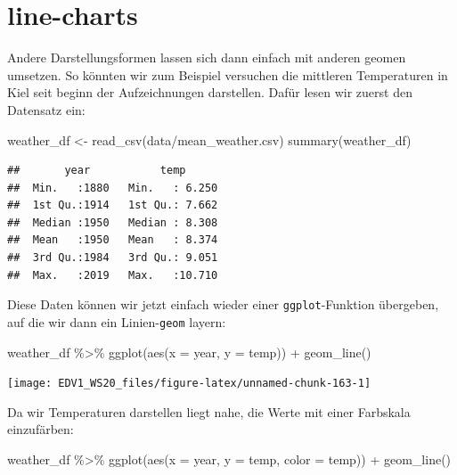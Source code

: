 \documentclass[
]{book}
\newenvironment{Shaded}{\begin{snugshade}}{\end{snugshade}}
\newcommand{\AttributeTok}[1]{\textcolor[rgb]{0.77,0.63,0.00}{#1}}
\newcommand{\FunctionTok}[1]{\textcolor[rgb]{0.00,0.00,0.00}{#1}}
\newcommand{\NormalTok}[1]{#1}
\newcommand{\OtherTok}[1]{\textcolor[rgb]{0.56,0.35,0.01}{#1}}
\newcommand{\SpecialCharTok}[1]{\textcolor[rgb]{0.00,0.00,0.00}{#1}}
\newcommand{\StringTok}[1]{\textcolor[rgb]{0.31,0.60,0.02}{#1}}
\begin{document}
\hypertarget{line-charts}{%
\section{line-charts}\label{line-charts}}

Andere Darstellungsformen lassen sich dann einfach mit anderen geomen umsetzen. So könnten wir zum Beispiel versuchen die mittleren Temperaturen in Kiel seit beginn der Aufzeichnungen darstellen. Dafür lesen wir zuerst den Datensatz ein:

\begin{Shaded}
\begin{Highlighting}[]
\NormalTok{weather\_df }\OtherTok{\textless{}{-}} \FunctionTok{read\_csv}\NormalTok{(}\StringTok{\textquotesingle{}data/mean\_weather.csv\textquotesingle{}}\NormalTok{)}
\FunctionTok{summary}\NormalTok{(weather\_df)}
\end{Highlighting}
\end{Shaded}

\begin{verbatim}
##       year           temp       
##  Min.   :1880   Min.   : 6.250  
##  1st Qu.:1914   1st Qu.: 7.662  
##  Median :1950   Median : 8.308  
##  Mean   :1950   Mean   : 8.374  
##  3rd Qu.:1984   3rd Qu.: 9.051  
##  Max.   :2019   Max.   :10.710
\end{verbatim}

Diese Daten können wir jetzt einfach wieder einer \texttt{ggplot}-Funktion übergeben, auf die wir dann ein Linien-\texttt{geom} layern:

\begin{Shaded}
\begin{Highlighting}[]
\NormalTok{weather\_df }\SpecialCharTok{\%\textgreater{}\%} 
  \FunctionTok{ggplot}\NormalTok{(}\FunctionTok{aes}\NormalTok{(}\AttributeTok{x =}\NormalTok{ year,}
             \AttributeTok{y =}\NormalTok{ temp)) }\SpecialCharTok{+}
  \FunctionTok{geom\_line}\NormalTok{()}
\end{Highlighting}
\end{Shaded}

\begin{center}\texttt{[image: EDV1\_WS20\_files/figure-latex/unnamed-chunk-163-1]} \end{center}

Da wir Temperaturen darstellen liegt nahe, die Werte mit einer Farbskala einzufärben:

\begin{Shaded}
\begin{Highlighting}[]
\NormalTok{weather\_df }\SpecialCharTok{\%\textgreater{}\%} 
  \FunctionTok{ggplot}\NormalTok{(}\FunctionTok{aes}\NormalTok{(}\AttributeTok{x =}\NormalTok{ year,}
             \AttributeTok{y =}\NormalTok{ temp,}
             \AttributeTok{color =}\NormalTok{ temp)) }\SpecialCharTok{+}
  \FunctionTok{geom\_line}\NormalTok{()}
\end{Highlighting}
\end{Shaded}
\end{document}
